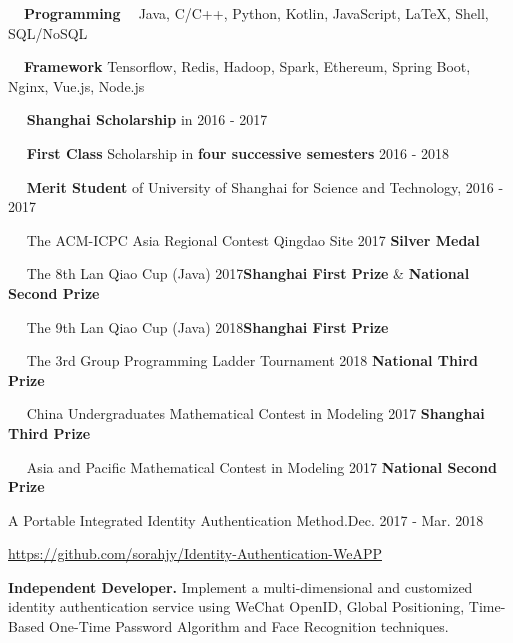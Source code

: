 \documentclass{sorahjy_cv}
\begin{document}
%
%

\begin{description}{}
	\item{\textbf{\ \ Programming \ }} Java, C/C++, Python, Kotlin, JavaScript, \LaTeX, Shell, SQL/NoSQL
	\item{\textbf{\ \ Framework\quad \quad}} Tensorflow, Redis, Hadoop, Spark, Ethereum, Spring Boot, Nginx, Vue.js, Node.js 
\end{description}


%
%

\begin{description}{}
	\item{\ \ } \textbf{Shanghai Scholarship} in 2016 - 2017
	\item{\ \ } \textbf{First Class} Scholarship in \textbf{four successive semesters} 2016 - 2018
	\item{\ \ } \textbf{Merit Student} of University of Shanghai for Science and Technology, 2016 - 2017
	\item{\ \ } The ACM-ICPC Asia Regional Contest Qingdao Site 2017 \hfill \textbf{Silver Medal}
	\item{\ \ } The 8th Lan Qiao Cup (Java) 2017\hfill \textbf{Shanghai First Prize} \& \textbf{National Second Prize}
	\item{\ \ } The 9th Lan Qiao Cup (Java) 2018\hfill \textbf{Shanghai First Prize}
	\item{\ \ } The 3rd Group Programming Ladder Tournament 2018 \hfill \textbf{National Third Prize}
	\item{\ \ } China Undergraduates Mathematical Contest in Modeling 2017 \hfill \textbf{Shanghai Third Prize}
	\item{\ \ } Asia and Pacific Mathematical Contest in Modeling 2017 \hfill \textbf{National Second Prize}
\end{description}


%
%

\begin{sectionContentSimple}{A Portable Integrated Identity Authentication Method.}{Dec. 2017 - Mar. 2018}
	\item \url{https://github.com/sorahjy/Identity-Authentication-WeAPP}
	\item \textbf{Independent Developer.} Implement a multi-dimensional and customized identity authentication service using WeChat OpenID, Global Positioning, Time-Based One-Time Password Algorithm and Face Recognition techniques.
\end{sectionContentSimple}
\end{document}
